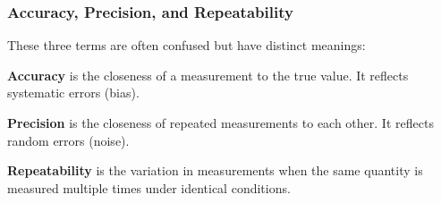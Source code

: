 
\subsubsection{Accuracy, Precision, and Repeatability}

These three terms are often confused but have distinct meanings:

\textbf{Accuracy} is the closeness of a measurement to the true value. It reflects systematic errors (bias).

\textbf{Precision} is the closeness of repeated measurements to each other. It reflects random errors (noise).

\textbf{Repeatability} is the variation in measurements when the same quantity is measured multiple times under identical conditions.

